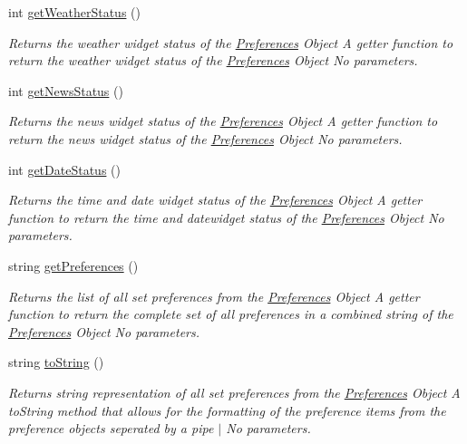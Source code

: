 \begin{DoxyCompactItemize}
int \mbox{\hyperlink{class_preferences_a94381281f2cbf83035484eb1704e6b83}{get\+Weather\+Status}} ()
\begin{DoxyCompactList}\small\item\em Returns the weather widget status of the \mbox{\hyperlink{class_preferences}{Preferences}} Object  A getter function to return the weather widget status of the \mbox{\hyperlink{class_preferences}{Preferences}} Object  No parameters. \end{DoxyCompactList}\item 
int \mbox{\hyperlink{class_preferences_a6c9f2c89fa3de8956120d3a4eddb8e20}{get\+News\+Status}} ()
\begin{DoxyCompactList}\small\item\em Returns the news widget status of the \mbox{\hyperlink{class_preferences}{Preferences}} Object  A getter function to return the news widget status of the \mbox{\hyperlink{class_preferences}{Preferences}} Object  No parameters. \end{DoxyCompactList}\item 
int \mbox{\hyperlink{class_preferences_afbdb72ac6c36492784e17b4d7e217ecc}{get\+Date\+Status}} ()
\begin{DoxyCompactList}\small\item\em Returns the time and date widget status of the \mbox{\hyperlink{class_preferences}{Preferences}} Object  A getter function to return the time and datewidget status of the \mbox{\hyperlink{class_preferences}{Preferences}} Object  No parameters. \end{DoxyCompactList}\item 
string \mbox{\hyperlink{class_preferences_a383d16a7105233f96b089403ddcfbd1c}{get\+Preferences}} ()
\begin{DoxyCompactList}\small\item\em Returns the list of all set preferences from the \mbox{\hyperlink{class_preferences}{Preferences}} Object  A getter function to return the complete set of all preferences in a combined string of the \mbox{\hyperlink{class_preferences}{Preferences}} Object  No parameters. \end{DoxyCompactList}\item 
string \mbox{\hyperlink{class_preferences_a69602ab02790104c3c3f49086c4f3463}{to\+String}} ()
\begin{DoxyCompactList}\small\item\em Returns string representation of all set preferences from the \mbox{\hyperlink{class_preferences}{Preferences}} Object  A to\+String method that allows for the formatting of the preference items from the preference objects seperated by a pipe \textquotesingle{}$\vert$\textquotesingle{}  No parameters. \end{DoxyCompactList}\end{DoxyCompactItemize}


